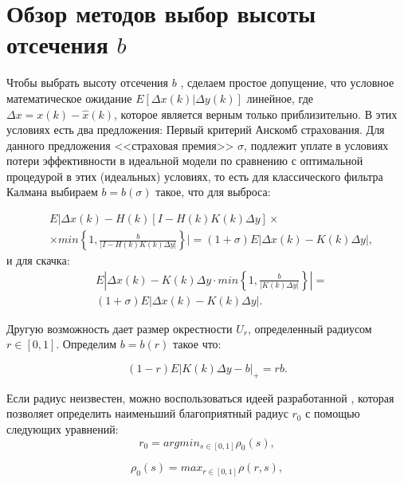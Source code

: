 \cite{RePEc:spr:stmapp:v:17:y:2008:i:1:p:13-40}

\section{Обзор методов выбор высоты отсечения $b$}
Чтобы выбрать высоту отсечения $b$ \cite{huber1,huber2}, сделаем простое допущение, что условное математическое ожидание $E[\Delta x(k)|\Delta y(k)]$ линейное, где $\Delta x=x(k)-\hat x(k)$, 
которое является верным только приблизительно. В этих условиях есть два предложения:
Первый критерий Анскомб страхования. 
Для данного предложения <<страховая премия>> $\sigma$, подлежит уплате в условиях потери эффективности в идеальной модели по сравнению с оптимальной процедурой в этих (идеальных) условиях, 
то есть для классического фильтра Калмана выбираем $b=b(\sigma)$ такое, что для выброса:

\begin{equation}
\begin{split}
&E\bigg|\Delta x(k)-H(k)[I-H(k)K(k)\Delta y] \times\\
& \times min\left\{1,\frac{b}{|I-H(k)K(k)\Delta y|}\right\}\bigg|=(1+\sigma)E|\Delta x(k)-K(k)\Delta y|, 
\end{split}
\end{equation}
и для скачка:
\begin{equation}
\begin{split}
&E\left|\Delta x(k)-K(k)\Delta y\cdot min\left\{1,\frac{b}{|K(k)\Delta y|}\right\}\right|=\\
&(1+\sigma)E|\Delta x(k)-K(k)\Delta y|.
\end{split}
\end{equation}

Другую возможность дает размер окрестности $U_r$, определенный радиусом $r\in[0,1]$.
Определим $b=b(r)$ такое что:

\begin{equation}
(1-r)E|K(k)\Delta y-b|_+=rb.
\end{equation}

Если радиус неизвестен, можно воспользоваться идеей разработанной \cite{RePEc:spr:stmapp:v:17:y:2008:i:1:p:13-40,citeulike:6486145}, которая позволяет определить наименьший благоприятный радиус $r_0$ с помощью следующих уравнений:
\begin{equation}
r_0=argmin_{s\in[0,1]}\rho_0(s),
\end{equation}

\begin{equation}
\rho_0(s)=max_{r\in[0,1]}\rho(r,s),
\end{equation}


